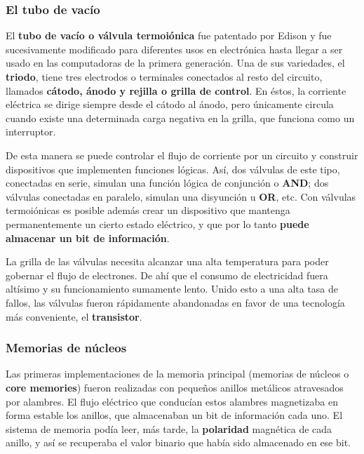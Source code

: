 \documentclass[spanish,a4paper,]{article}
\begin{document}
\hypertarget{el-tubo-de-vacuxedo}{%
\subsubsection{El tubo de vacío}\label{el-tubo-de-vacuxedo}}

El \textbf{tubo de vacío o válvula termoiónica} fue patentado por Edison
y fue sucesivamente modificado para diferentes usos en electrónica hasta
llegar a ser usado en las computadoras de la primera generación. Una de
sus variedades, el \textbf{triodo}, tiene tres electrodos o terminales
conectados al resto del circuito, llamados \textbf{cátodo, ánodo y
rejilla o grilla de control}. En éstos, la corriente eléctrica se dirige
siempre desde el cátodo al ánodo, pero únicamente circula cuando existe
una determinada carga negativa en la grilla, que funciona como un
interruptor.

De esta manera se puede controlar el flujo de corriente por un circuito
y construir dispositivos que implementen funciones lógicas. Así, dos
válvulas de este tipo, conectadas en serie, simulan una función lógica
de conjunción o \textbf{AND}; dos válvulas conectadas en paralelo,
simulan una disyunción u \textbf{OR}, etc. Con válvulas termoiónicas es
posible además crear un dispositivo que mantenga permanentemente un
cierto estado eléctrico, y que por lo tanto \textbf{puede almacenar un
bit de información}.

La grilla de las válvulas necesita alcanzar una alta temperatura para
poder gobernar el flujo de electrones. De ahí que el consumo de
electricidad fuera altísimo y su funcionamiento sumamente lento. Unido
esto a una alta tasa de fallos, las válvulas fueron rápidamente
abandonadas en favor de una tecnología más conveniente, el
\textbf{transistor}.

\hypertarget{memorias-de-nuxfacleos}{%
\subsubsection{Memorias de núcleos}\label{memorias-de-nuxfacleos}}

Las primeras implementaciones de la memoria principal (memorias de
núcleos o \textbf{core memories}) fueron realizadas con pequeños anillos
metálicos atravesados por alambres. El flujo eléctrico que conducían
estos alambres magnetizaba en forma estable los anillos, que almacenaban
un bit de información cada uno. El sistema de memoria podía leer, más
tarde, la \textbf{polaridad} magnética de cada anillo, y así se
recuperaba el valor binario que había sido almacenado en ese bit.
\end{document}
